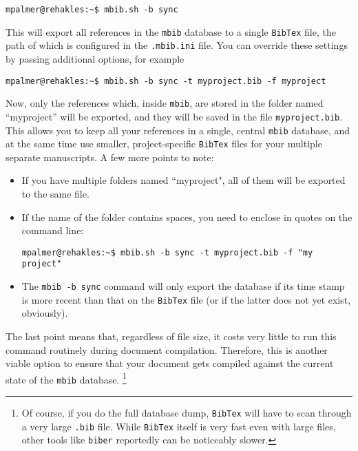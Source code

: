 \documentclass[10pt]{article}
\newcommand*{\mbib}{\texttt{mbib}\xspace}
\newcommand*{\bibtex}{\texttt{BibTex}\xspace}
\newcommand*{\ini}{\texttt{.mbib.ini}\xspace}
\begin{document}
\begin{verbatim}
mpalmer@rehakles:~$ mbib.sh -b sync
\end{verbatim}

\noindent This will export all references in the \mbib database to a single \bibtex file, the path of which is configured in the \ini file. You can override these settings by passing additional options, for example 

\begin{verbatim}
mpalmer@rehakles:~$ mbib.sh -b sync -t myproject.bib -f myproject
\end{verbatim}

\noindent Now, only the references which, inside \mbib, are stored in the folder named ``myproject'' will be exported, and they will be saved in the file \texttt{myproject.bib}. This allows you to keep all your references in a single, central \mbib database, and at the same time use smaller, project-specific \bibtex files for your multiple separate manuscripts. A few more points to note: 

\begin{itemize}
\item If you have multiple folders named ``myproject", all of them will be exported to the same file. 

\item If the name of the folder contains spaces, you need to enclose in quotes on the command line:

\begin{verbatim}
mpalmer@rehakles:~$ mbib.sh -b sync -t myproject.bib -f "my project"
\end{verbatim}

\item The \texttt{\mbib\ -b sync} command will only export the database if its time stamp is more recent than that on the \bibtex file (or if the latter does not yet exist, obviously). 

\end{itemize}

\noindent The last point means that, regardless of file size, it costs very little to run this command routinely during document compilation. Therefore, this is another viable option to ensure that your document gets compiled against the current state of the \mbib database.%
%
\footnote{Of course, if you do the full database dump, \bibtex will have to scan through a very large \texttt{.bib} file. While \bibtex itself is very fast even with large files, other tools like \texttt{biber} reportedly can be noticeably slower.}
\end{document}
